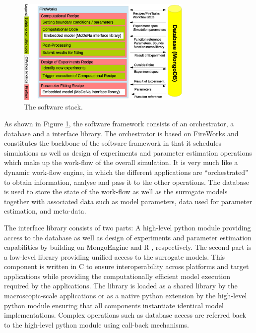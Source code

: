 \begin{figure}
  \centering
  \includegraphics[width=0.75\textwidth,keepaspectratio=true]{./Content/Figures/Software_Stack.eps}
  \caption{The {\MoDeNa} software stack.
  }
  \label{fig:SoftwareStack}
\end{figure}

As shown in Figure \ref{fig:SoftwareStack}, the software framework consists of
an orchestrator, a database and a interface library. The orchestrator is based
on FireWorks \cite{project:FireWorks} and constitutes the backbone of the
software framework in that it schedules simulations as well as design of
experiments and parameter estimation operations which make up the work-flow of
the overall simulation. It is very much like a dynamic work-flow engine, in
which the different applications are ``orchestrated'' to obtain information,
analyse and pass it to the other operations. The {\NoSQL} database {\MongoDB}
\cite{project:MongoDB} is used to store the state of the work-flow as well as
the surrogate models together with associated data such as model parameters,
data used for parameter estimation, and meta-data.

The interface library consists of two parts: A high-level python module
providing access to the database as well as design of experiments and parameter
estimation capabilities by building on MongoEngine \cite{project:MongoEngine}
and R \cite{project:R}, respectively. The second part is a low-level library
providing unified access to the surrogate models. This component is written in C
to ensure interoperability across platforms and target applications while
providing the computationally efficient model execution required by the
applications.  The library is loaded as a shared library by the
macroscopic-scale applications or as a native python extension by the high-level
python module ensuring that all components instantiate identical model
implementations. Complex operations such as database access are referred back to
the high-level python module using call-back mechanisms.
